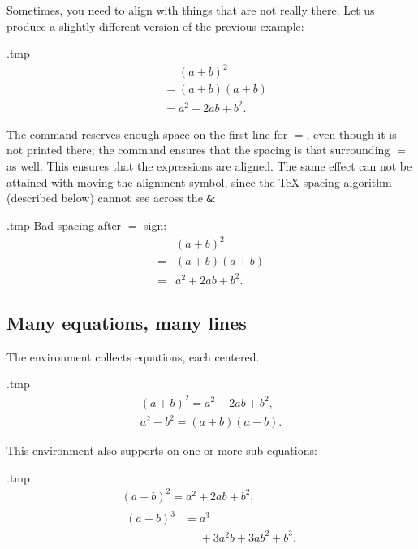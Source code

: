 Sometimes, you need to align with things that are not really there.
Let us produce a slightly different version of the previous example:
%
\begin{VerbatimOut}{\jobname.tmp}
\begin{equation}
\begin{split}
&\mathrel{\phantom{=}} (a+b)^2\\
&= (a+b)(a+b)\\
&= a^2 + 2ab + b^2.
\end{split}
\end{equation}
\end{VerbatimOut}
\ShowExample
%
The  command reserves enough space on the first line for $=$,
even though it is not printed there;
the  command ensures that the spacing is that surrounding $=$ as well.
This ensures that the expressions are aligned.
The same effect can not be attained with moving the alignment symbol,
since the \TeX{} spacing algorithm (described below) cannot see across the \verb|&|:
%
\begin{VerbatimOut}{\jobname.tmp}
Bad spacing after $=$ sign:
\begin{equation}
\begin{split}
&(a+b)^2\\
= &(a+b)(a+b)\\
= &a^2 + 2ab + b^2.
\end{split}
\end{equation}
\end{VerbatimOut}
\ShowExample



%
%
\subsection{Many equations, many lines}

The  environment collects equations, each centered.
%
\begin{VerbatimOut}{\jobname.tmp}
\begin{gather}
(a+b)^2 = a^2 + 2ab + b^2,\\
a^2 - b^2 = (a+b)(a-b).
\end{gather}
\end{VerbatimOut}
\ShowExample

This environment also supports  on one or more sub-equations:
%
\begin{VerbatimOut}{\jobname.tmp}
\begin{gather}
(a+b)^2 = a^2 + 2ab + b^2,\\
\begin{split}
(a+b)^3 &= a^3\\
&\mathrel{\phantom{=}} + 3a^2 b + 3ab^2 + b^3.
\end{split}
\end{gather}
\end{VerbatimOut}
\ShowExampleBelow

